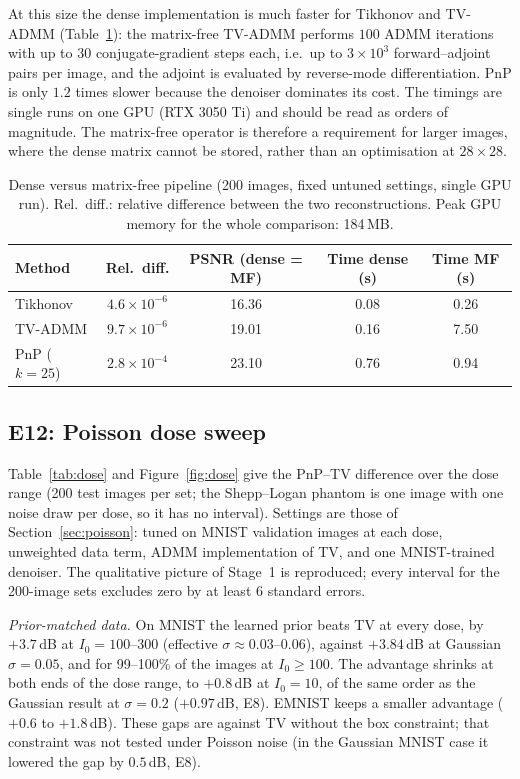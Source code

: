 At this size the dense implementation is much faster for Tikhonov and TV-ADMM (Table~\ref{tab:mf}): the matrix-free TV-ADMM
performs $100$ ADMM iterations with up to $30$ conjugate-gradient steps each, i.e.\ up to $3\times10^{3}$ forward--adjoint pairs per
image, and the adjoint is evaluated by reverse-mode differentiation. PnP is only $1.2$ times slower because the denoiser dominates its cost.
The timings are single runs on one GPU (RTX 3050 Ti) and should be read as orders of magnitude. The matrix-free operator is therefore a requirement for larger images, where the dense matrix cannot be stored,
rather than an optimisation at $28\times28$.

\begin{table}[htbp]
\centering\small\setlength{\tabcolsep}{4pt}
\caption{Dense versus matrix-free pipeline (200 images, fixed untuned settings, single GPU run). Rel.\ diff.: relative difference between
the two reconstructions. Peak GPU memory for the whole comparison: 184\,MB.}\label{tab:mf}
\begin{tabular}{lcccc}
\toprule
Method & Rel.\ diff. & PSNR (dense = MF) & Time dense (s) & Time MF (s)\\
\midrule
Tikhonov & $4.6\times10^{-6}$ & 16.36 & 0.08 & 0.26\\
TV-ADMM  & $9.7\times10^{-6}$ & 19.01 & 0.16 & 7.50\\
PnP ($k=25$) & $2.8\times10^{-4}$ & 23.10 & 0.76 & 0.94\\
\bottomrule
\end{tabular}
\end{table}


\subsection{E12: Poisson dose sweep}\label{sec:dose-results}
Table~\ref{tab:dose} and Figure~\ref{fig:dose} give the PnP--TV difference over the dose range (200 test images per set; the
Shepp--Logan phantom is one image with one noise draw per dose, so it has no interval). Settings are those of Section~\ref{sec:poisson}: tuned on MNIST
validation images at each dose, unweighted data term, ADMM implementation of TV, and one MNIST-trained denoiser. The qualitative picture of
Stage~1 is reproduced; every interval for the 200-image sets excludes zero by at least $6$ standard errors.

\emph{Prior-matched data.} On MNIST the learned prior beats TV at every dose, by $+3.7$\,dB at $I_0=100$--$300$ (effective $\sigma\approx0.03$--$0.06$), against $+3.84$\,dB at Gaussian $\sigma=0.05$,
and for 99--100\% of the images at $I_0\ge100$. The advantage shrinks at both ends of the dose range, to $+0.8$\,dB at $I_0=10$, of the same order as the Gaussian result at $\sigma=0.2$
($+0.97$\,dB, E8). EMNIST keeps a smaller advantage ($+0.6$ to $+1.8$\,dB). These gaps are against TV without the box constraint; that constraint was not tested
under Poisson noise (in the Gaussian MNIST case it lowered the gap by $0.5$\,dB, E8).

